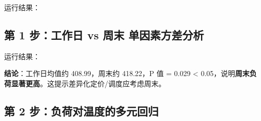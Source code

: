 运行结果：

\begin{Shaded}
\begin{Highlighting}[]
\end{Highlighting}
\end{Shaded}

\subsection{第 1 步：工作日 vs 周末
单因素方差分析}\label{ux7b2c-1-ux6b65ux5de5ux4f5cux65e5-vs-ux5468ux672b-ux5355ux56e0ux7d20ux65b9ux5deeux5206ux6790}

\begin{Shaded}
\begin{Highlighting}[]
\NormalTok{dfc[}\NormalTok{] }\OperatorTok{=}\NormalTok{ np.where(dfc[}\NormalTok{] }\OperatorTok{==} \NormalTok{, }\NormalTok{, }\NormalTok{)}
\OperatorTok{=}\OperatorTok{=}
\OperatorTok{=}\NormalTok{))}
\end{Highlighting}
\end{Shaded}

运行结果：

\begin{Shaded}
\begin{Highlighting}[]
\end{Highlighting}
\end{Shaded}

\textbf{结论}：工作日均值约 408.99，周末约 418.22，P 值 = 0.029
\textless{}
0.05，说明\textbf{周末负荷显著更高}。这提示差异化定价/调度应考虑周末。

\subsection{第 2
步：负荷对温度的多元回归}\label{ux7b2c-2-ux6b65ux8d1fux8377ux5bf9ux6e29ux5ea6ux7684ux591aux5143ux56deux5f52}

